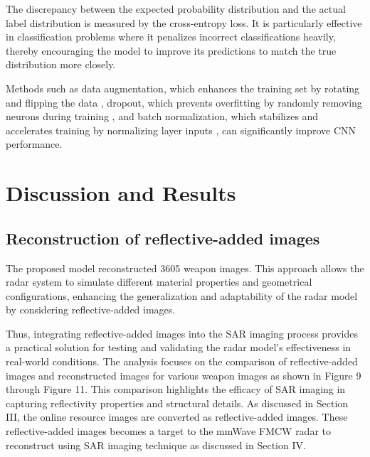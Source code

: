 \documentclass[journal,article,submit,pdftex,moreauthors]{Definitions/mdpi}
\begin{document}
The discrepancy between the expected probability distribution and the actual label distribution is measured by the cross-entropy loss. It is particularly effective in classification problems where it penalizes incorrect classifications heavily, thereby encouraging the model to improve its predictions to match the true distribution more closely.

Methods such as data augmentation, which enhances the training set by rotating and flipping the data \cite{shorten2019survey}, dropout, which prevents overfitting by randomly removing neurons during training \cite{srivastava2014dropout}, and batch normalization, which stabilizes and accelerates training by normalizing layer inputs \cite{ioffe2015batch}, can significantly improve CNN performance.


\section{Discussion and Results}
\subsection{Reconstruction of reflective-added images}
The proposed model reconstructed 3605 weapon images. This approach allows the radar system to simulate different material properties and geometrical configurations, enhancing the generalization and adaptability of the radar model by considering reflective-added images. 

Thus, integrating reflective-added images into the SAR imaging process provides a practical solution for testing and validating the radar model's effectiveness in real-world conditions. The analysis focuses on the comparison of reflective-added images and reconstructed images for various weapon images as shown in Figure 9 through Figure 11. This comparison highlights the efficacy of SAR imaging in capturing reflectivity properties and structural details. As discussed in Section III, the online resource images are converted as reflective-added images. These reflective-added images becomes a target to the mmWave FMCW radar to reconstruct using SAR imaging technique as discussed in Section IV.

\end{document}
